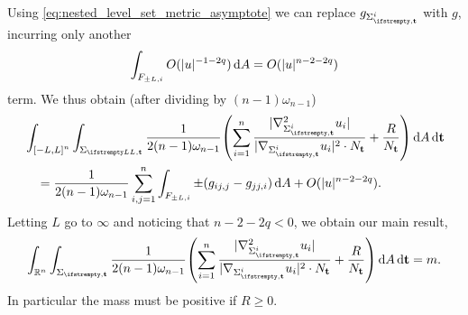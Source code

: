 \documentclass[draft]{amsart}
\newcommand*{\mathfullstop}{.}
\DeclarePairedDelimiter{\parens}{(}{)}
\let\p\parens %
\newcommand*{\reals}{\mathbb{R}}
\DeclarePairedDelimiter{\abs}{\lvert}{\rvert} %
\begin{document}
Using \cref{eq:nested_level_set_metric_asymptote} we can replace \( g_{\nls^i} \) with \( g \), incurring only another 
\begin{equation*}
    \int_{F_{\pm L,i}}O(\abs{u}^{-1-2q})\odif{A}=O(\abs{u}^{n-2-2q})
\end{equation*} 
term. We thus obtain (after dividing by \( (n-1)\omega_{n-1} \))
\begin{align*}
    &\int_{\interval{-L}{L}^n}\int_{\nls[L]}\frac{1}{2(n-1)\omega_{n-1}}\p*{\sum_{i=1}^{n}\frac{\abs{\nabla_{\nls^i}^2 u_i}}{\abs{\nabla_{\nls^i}u_i}^2\cdot N_{\vect{t}}}+\frac{R}{N_{\vect{t}}}}\odif{A}\odif{\vect{t}}\\
    &\quad=\frac{1}{2(n-1)\omega_{n-1}}\sum_{i,j=1}^n\int_{F_{\pm L,i}}\pm(g_{ij,j}-g_{jj,i})\odif{A}+O(\abs{u}^{n-2-2q})\mathfullstop
\end{align*}
Letting \( L \) go to \( \infty \) and noticing that \( n-2-2q<0 \), we obtain our main result,
\begin{equation*}
    \int_{\reals^n}\int_{\nls}\frac{1}{2(n-1)\omega_{n-1}}\p*{\sum_{i=1}^{n}\frac{\abs{\nabla_{\nls^i}^2 u_i}}{\abs{\nabla_{\nls^i}u_i}^2\cdot N_{\vect{t}}}+\frac{R}{N_{\vect{t}}}}\odif{A}\odif{\vect{t}}=m.
\end{equation*}
In particular the mass must be positive if \( R\geq 0. \)


\appendix
\end{document}
